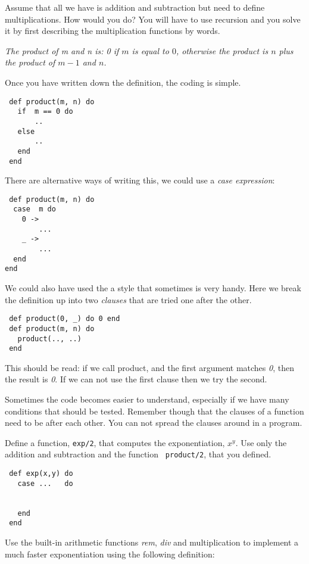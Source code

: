 \documentclass[a4paper,11pt]{article}
\begin{document}
Assume that all we have is addition and subtraction but need to define
multiplications. How would you do? You will have to use recursion and
you solve it by first describing the multiplication functions by words.

{\em The product of m and n is: 0 if $m$ is equal to $0$, otherwise the
  product is $n$ plus the product of $m-1$ and $n$.}

Once you have written down the definition, the coding is simple.

\begin{verbatim}
 def product(m, n) do
   if  m == 0 do
       ..
   else 
       ..
   end
 end
\end{verbatim}

There are alternative ways of writing this, we could use a {\em case
  expression}:

\begin{verbatim}
 def product(m, n) do
  case  m do
    0 -> 
        ...
    _ -> 
        ...
  end
end
\end{verbatim}

We could also have used the a style that sometimes is very handy. Here
we break the definition up into two {\em clauses} that are tried one
after the other.

\begin{verbatim}
 def product(0, _) do 0 end
 def product(m, n) do 
   product(.., ..)
 end
\end{verbatim}

This should be read: if we call product, and the first argument
matches {\em 0}, then the result is {\em 0}. If we can not use the
first clause then we try the second.

Sometimes the code becomes easier to understand, especially if we have
many conditions that should be tested. Remember though that the
clauses of a function need to be after each other. You can not spread
the clauses around in a program.


Define a function, {\tt exp/2}, that computes the exponentiation,
$x^y$. Use only the addition and subtraction and the function {\tt
  product/2}, that you defined.

\begin{verbatim}
 def exp(x,y) do 
   case ...   do

 
   end
 end
\end{verbatim}

Use the built-in arithmetic functions {\em rem}, {\em div} and
multiplication {\em *} to implement a much faster exponentiation using
the following definition:
\end{document}
